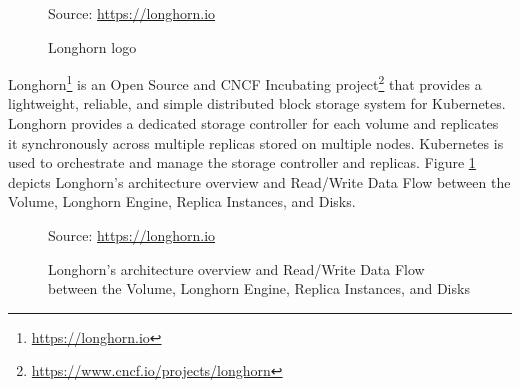 \begin{figure} %
  \centering
  \def\stackalignment{r} %
  {\scriptsize \parbox[t]{\linewidth}{ Source: \url{https://longhorn.io}} }
  \caption{Longhorn logo}
\end{figure}

Longhorn\footnote{\url{https://longhorn.io}} is an Open Source and CNCF Incubating
project\footnote{\url{https://www.cncf.io/projects/longhorn}} that provides a lightweight,
reliable, and simple distributed block storage system for Kubernetes. Longhorn
provides a dedicated storage controller for each volume and replicates it
synchronously across multiple replicas stored on multiple nodes. Kubernetes is used
to orchestrate and manage the storage controller and replicas. Figure
\ref{fig:longhorn} depicts Longhorn's architecture overview and Read/Write Data
Flow between the Volume, Longhorn Engine, Replica Instances, and Disks.

\begin{figure}[htbp]
  \centering
  \def\stackalignment{r} %
  {\scriptsize Source: \url{https://longhorn.io} }
  \caption{Longhorn's
  architecture
  overview
  and
  Read/Write
  Data
  Flow
  between
  the
  Volume,
  Longhorn
  Engine,
  Replica
  Instances,
  and
  Disks}
  \label{fig:longhorn}
\end{figure}

